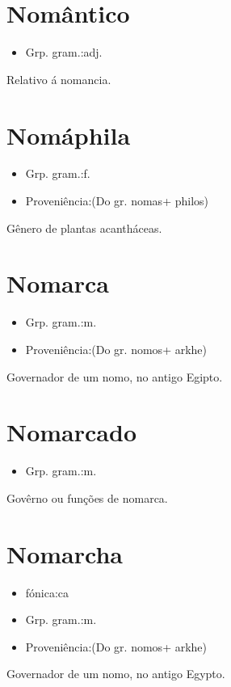 \section{Nomântico}
\begin{itemize}
\item {Grp. gram.:adj.}
\end{itemize}
Relativo á nomancia.
\section{Nomáphila}
\begin{itemize}
\item {Grp. gram.:f.}
\end{itemize}
\begin{itemize}
\item {Proveniência:(Do gr. \textunderscore nomas\textunderscore  + \textunderscore philos\textunderscore )}
\end{itemize}
Gênero de plantas acantháceas.
\section{Nomarca}
\begin{itemize}
\item {Grp. gram.:m.}
\end{itemize}
\begin{itemize}
\item {Proveniência:(Do gr. \textunderscore nomos\textunderscore  + \textunderscore arkhe\textunderscore )}
\end{itemize}
Governador de um nomo, no antigo Egipto.
\section{Nomarcado}
\begin{itemize}
\item {Grp. gram.:m.}
\end{itemize}
Govêrno ou funções de nomarca.
\section{Nomarcha}
\begin{itemize}
\item {fónica:ca}
\end{itemize}
\begin{itemize}
\item {Grp. gram.:m.}
\end{itemize}
\begin{itemize}
\item {Proveniência:(Do gr. \textunderscore nomos\textunderscore  + \textunderscore arkhe\textunderscore )}
\end{itemize}
Governador de um nomo, no antigo Egypto.
